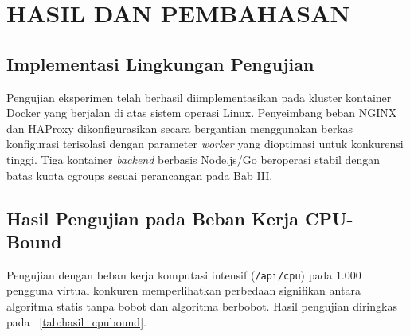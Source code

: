 
\chapter{HASIL DAN PEMBAHASAN}

\section{Implementasi Lingkungan Pengujian}
Pengujian eksperimen telah berhasil diimplementasikan pada kluster kontainer Docker yang berjalan di atas sistem operasi Linux. Penyeimbang beban NGINX dan HAProxy dikonfigurasikan secara bergantian menggunakan berkas konfigurasi terisolasi dengan parameter \textit{worker} yang dioptimasi untuk konkurensi tinggi. Tiga kontainer \textit{backend} berbasis Node.js/Go beroperasi stabil dengan batas kuota cgroups sesuai perancangan pada Bab III.

\section{Hasil Pengujian pada Beban Kerja CPU-Bound}
Pengujian dengan beban kerja komputasi intensif (\texttt{/api/cpu}) pada 1.000 pengguna virtual konkuren memperlihatkan perbedaan signifikan antara algoritma statis tanpa bobot dan algoritma berbobot. Hasil pengujian diringkas pada \tablename\ \ref{tab:hasil_cpubound}.

